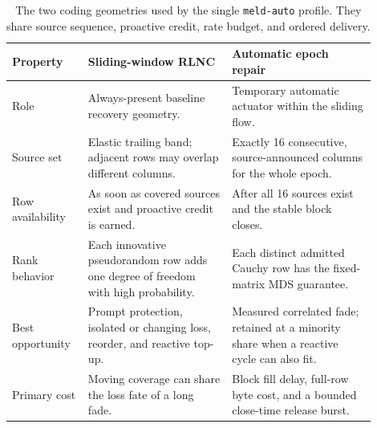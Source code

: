 \documentclass[11pt]{article}
\newcommand{\code}[1]{\ifmmode\text{\texttt{#1}}\else\texttt{#1}\fi}
\begin{document}
\begin{table}[htbp]
\centering
\renewcommand{\arraystretch}{1.17}
\begin{tabular}{>{\raggedright\arraybackslash}p{0.18\linewidth}
                >{\raggedright\arraybackslash}p{0.36\linewidth}
                >{\raggedright\arraybackslash}p{0.36\linewidth}}
\toprule
Property & Sliding-window RLNC & Automatic epoch repair \\
\midrule
Role & Always-present baseline recovery geometry. & Temporary automatic
actuator within the sliding flow. \\
Source set & Elastic trailing band; adjacent rows may overlap different columns. &
Exactly 16 consecutive, source-announced columns for the whole epoch. \\
Row availability & As soon as covered sources exist and proactive credit is
earned. & After all 16 sources exist and the stable block closes. \\
Rank behavior & Each innovative pseudorandom row adds one degree of freedom with
high probability. & Each distinct admitted Cauchy row has the fixed-matrix MDS
guarantee. \\
Best opportunity & Prompt protection, isolated or changing loss, reorder, and
reactive top-up. & Measured correlated fade; retained at a minority share when a
reactive cycle can also fit. \\
Primary cost & Moving coverage can share the loss fate of a long fade. & Block
fill delay, full-row byte cost, and a bounded close-time release burst. \\
\bottomrule
\end{tabular}
\caption{The two coding geometries used by the single \code{meld-auto} profile.
They share source sequence, proactive credit, rate budget, and ordered delivery.}
\label{tab:coding-geometries}
\end{table}
\end{document}
